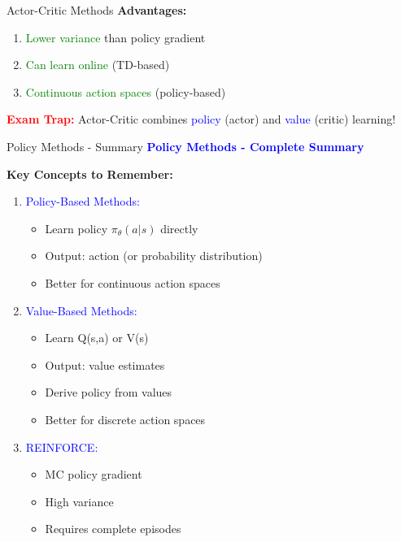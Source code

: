 \documentclass[8pt]{beamer}
\begin{document}
\begin{frame}{Actor-Critic Methods}
		\textbf{Advantages:}
		\begin{enumerate}
			\item \textcolor{green}{Lower variance} than policy gradient
			\item \textcolor{green}{Can learn online} (TD-based)
			\item \textcolor{green}{Continuous action spaces} (policy-based)
		\end{enumerate}
		
		\textcolor{red}{\textbf{Exam Trap:}} Actor-Critic combines \textcolor{blue}{policy} (actor) and \textcolor{blue}{value} (critic) learning!
	\end{frame}
	
	\begin{frame}{Policy Methods - Summary}
		\fontsize{6.5}{7.5}\selectfont
		\textcolor{blue}{\textbf{Policy Methods - Complete Summary}}
		
		\textbf{Key Concepts to Remember:}
		
		\begin{enumerate}
			\item \textcolor{blue}{Policy-Based Methods:}
			\begin{itemize}
				\item Learn policy $\pi_\theta(a|s)$ directly
				\item Output: action (or probability distribution)
				\item Better for continuous action spaces
			\end{itemize}
			
			\item \textcolor{blue}{Value-Based Methods:}
			\begin{itemize}
				\item Learn Q(s,a) or V(s)
				\item Output: value estimates
				\item Derive policy from values
				\item Better for discrete action spaces
			\end{itemize}
			
			\item \textcolor{blue}{REINFORCE:}
			\begin{itemize}
				\item MC policy gradient
				\item High variance
				\item Requires complete episodes
			\end{itemize}
			

\end{enumerate}
\end{frame}
\end{document}
